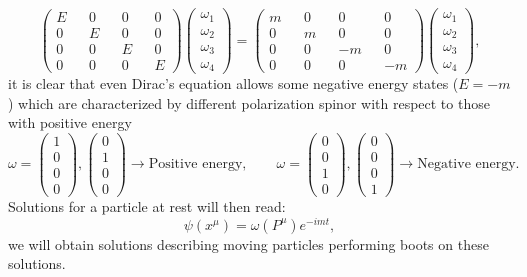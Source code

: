 \begin{equation*}
    \begin{pmatrix}
        E&&0&&0&&0\\
        0&&E&&0&&0\\
        0&&0&& E&&0\\
        0&&0&&0&&E
    \end{pmatrix}
    \begin{pmatrix}
        \omega_1\\\omega_2\\\omega_3\\\omega_4
    \end{pmatrix}
    =\begin{pmatrix}
        m&&0&&0&&0\\
        0&&m&&0&&0\\
        0&&0&& -m&&0\\
        0&&0&&0&&-m
    \end{pmatrix}
    \begin{pmatrix}
        \omega_1\\\omega_2\\\omega_3\\\omega_4
    \end{pmatrix},
\end{equation*}
it is clear that even Dirac's equation allows some negative energy states ($E=-m$) which are characterized by different polarization spinor with respect to those with positive energy
\begin{equation*}
    \omega=\begin{pmatrix}
        1\\0\\0\\0
    \end{pmatrix},
    \begin{pmatrix}
        0\\1\\0\\0
    \end{pmatrix}\rightarrow \text{Positive energy},\qquad
    \omega=\begin{pmatrix}
        0\\0\\1\\0
    \end{pmatrix},
    \begin{pmatrix}
        0\\0\\0\\1
    \end{pmatrix}\rightarrow \text{Negative energy}.
\end{equation*}
Solutions for a particle at rest will then read:
\begin{equation*}
    \psi(x^\mu)=\omega(P^\mu)e^{-imt},
\end{equation*}
we will obtain solutions describing moving particles performing boots on these solutions.
